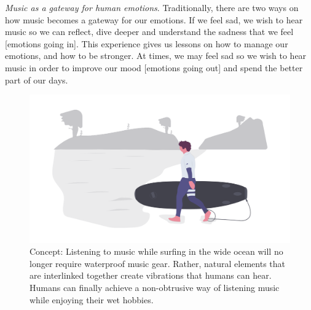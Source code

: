 \documentclass[acmtog]{acmart}
\begin{document}

\textit{Music as a gateway for human emotions}. Traditionally, there are two ways on how music becomes a gateway for our emotions. If we feel sad, we wish to hear music so we can reflect, dive deeper and understand the sadness that we feel [emotions going in]. This experience gives us lessons on how to manage our emotions, and how to be stronger. At times, we may feel sad so we wish to hear music in order to improve our mood [emotions going out] and spend the better part of our days. 
% 

\begin{figure}[h]
  \centering
  \includegraphics[width=\linewidth]{acmart-master-2/samples/surfbnw.png}
  \caption{Concept: Listening to music while surfing in the wide ocean will no longer require waterproof music gear. Rather, natural elements that are interlinked together create vibrations that humans can hear. Humans can finally achieve a non-obtrusive way of listening music while enjoying their wet hobbies. }
  \label{fig: surf}
\end{figure}
\end{document}
